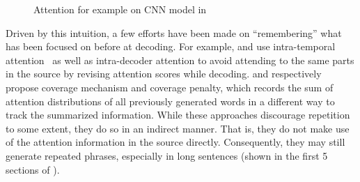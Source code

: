 \begin{figure}[th!]
\centering
{}
\quad
{}
\quad
{}
\caption{Attention for example on CNN model in }
\label{fig:attn_map}
\end{figure}

Driven by this intuition, a few efforts have been made on ``remembering''
what has been focused on before at decoding. 
For example, 
\cite{PaulusXS17} and 
\cite{FanGA18} use intra-temporal 
attention~\citep{NallapatiZSGX16} as well as intra-decoder attention to avoid
attending to the same parts in the source by 
revising attention scores while decoding. 
\cite{SeeLM17} and \cite{GehrmannDR18}
respectively propose coverage mechanism and coverage penalty,
which records the sum of attention distributions of all previously generated words 
in a different way to track the summarized information.  
While these approaches discourage repetition to some extent,
they do so in an indirect manner. That is, they do not 
make use of the attention information in the source directly.
Consequently, they may still generate repeated phrases, 
especially in long sentences (shown in the first 5 sections of
).


